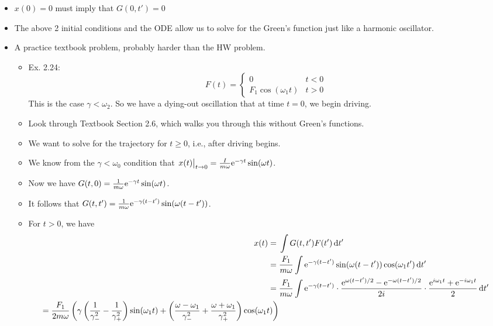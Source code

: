\documentclass[../notes.tex]{subfiles}
\begin{document}
\begin{itemize}
    \item $x(0)=0$ must imply that $G(0,t')=0$
    \item The above 2 initial conditions and the ODE allow us to solve for the Green's function just like a harmonic oscillator.
    \item A practice textbook problem, probably harder than the HW problem.
    \begin{itemize}
        \item Ex. 2.24:
        \begin{equation*}
            F(t) =
            \begin{cases}
                0 & t<0\\
                F_1\cos(\omega_1t) & t>0
            \end{cases}
        \end{equation*}
        This is the case $\gamma<\omega_2$. So we have a dying-out oscillation that at time $t=0$, we begin driving.
        \item Look through Textbook Section 2.6, which walks you through this without Green's functions.
        \item We want to solve for the trajectory for $t\geq 0$, i.e., after driving begins.
        \item We know from the $\gamma<\omega_0$ condition that $\eval{x(t)}_{t\to 0}=\frac{I}{m\omega}\e[-\gamma t]\sin(\omega t)$.
        \item Now we have $G(t,0)=\frac{1}{m\omega}\e[-\gamma t]\sin(\omega t)$.
        \item It follows that $G(t,t')=\frac{1}{m\omega}\e[-\gamma(t-t')]\sin(\omega(t-t'))$.
        \item For $t>0$, we have
        \begin{align*}
            x(t) ={}& \int G(t,t')F(t')\dd{t'}\\
            ={}& \frac{F_1}{m\omega}\int\e[-\gamma(t-t')]\sin(\omega(t-t'))\cos(\omega_1t')\dd{t'}\\
            ={}& \frac{F_1}{m\omega}\int\e[-\gamma(t-t')]\cdot\frac{\e[\omega(t-t')/2]-\e[-\omega(t-t')/2]}{2i}\cdot\frac{\e[i\omega_1t]+\e[-i\omega_1t]}{2}\dd{t'}\\
            \begin{split}
                ={}& \frac{F_1}{2m\omega}\left( \gamma\left( \frac{1}{\gamma_-^2}-\frac{1}{\gamma_+^2} \right)\sin(\omega_1t)+\left( \frac{\omega-\omega_1}{\gamma_-^2}+\frac{\omega+\omega_1}{\gamma_+^2} \right)\cos(\omega_1t) \right)\\

\end{split}
\end{align*}
\end{itemize}
\end{itemize}
\end{document}

